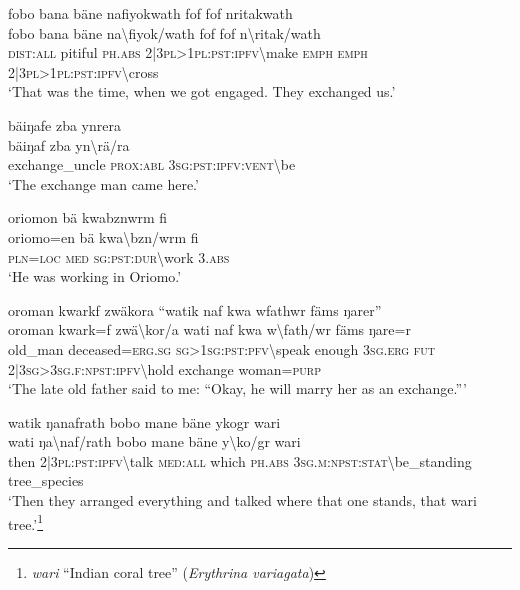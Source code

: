 \ea\label{ex:14:a3165}
fobo bana bäne nafiyokwath fof fof nritakwath\\
\gll fobo	bana	bäne	na{\textbackslash}fiyok/wath	fof	fof	n{\textbackslash}ritak/wath\\
     \textsc{dist}:\textsc{all}	pitiful	\textsc{ph}.\textsc{abs}	2|3\textsc{pl}>1\textsc{pl}:\textsc{pst}:\textsc{ipfv}{\textbackslash}make	\textsc{emph}	\textsc{emph}	2|3\textsc{pl}>1\textsc{pl}:\textsc{pst}:\textsc{ipfv}{\textbackslash}cross\\
\glt `That was the time, when we got engaged. They exchanged us.'
\z

\ea\label{ex:14:a3168}
bäiŋafe zba ynrera\\
\gll bäiŋaf	zba	yn{\textbackslash}rä/ra\\
     exchange\_uncle	\textsc{prox}:\textsc{abl}	3\textsc{sg}:\textsc{pst}:\textsc{ipfv}:\textsc{vent}{\textbackslash}be\\
\glt `The exchange man came here.'
\z

\ea\label{ex:14:a3169}
oriomon bä kwabznwrm fi\\
\gll oriomo=en	bä	kwa{\textbackslash}bzn/wrm	fi\\
     \textsc{pln}=\textsc{loc}	\textsc{med}	\textsc{sg}:\textsc{pst}:\textsc{dur}{\textbackslash}work	3.\textsc{abs}\\
\glt `He was working in Oriomo.'
\z

\ea\label{ex:14:a3170}
oroman kwarkf zwäkora ``watik naf kwa wfathwr fäms ŋarer''\\
\gll oroman	kwark=f	zwä{\textbackslash}kor/a	wati	naf	kwa	w{\textbackslash}fath/wr	fäms	ŋare=r\\
     old\_man	deceased=\textsc{erg}.\textsc{sg}	\textsc{sg}>1\textsc{sg}:\textsc{pst}:\textsc{pfv}{\textbackslash}speak	enough	3\textsc{sg}.\textsc{erg}	\textsc{fut}	2|3\textsc{sg}>3\textsc{sg}.\textsc{f}:\textsc{npst}:\textsc{ipfv}{\textbackslash}hold	exchange	woman=\textsc{purp}\\
\glt `The late old father said to me: ``Okay, he will marry her as an exchange.'''
\z

\ea\label{ex:14:a3171}
watik ŋanafrath bobo mane bäne ykogr wari\\
\gll wati	ŋa{\textbackslash}naf/rath	bobo	mane	bäne	y{\textbackslash}ko/gr	wari\\
     then	2|3\textsc{pl}:\textsc{pst}:\textsc{ipfv}{\textbackslash}talk	\textsc{med}:\textsc{all}	which	\textsc{ph}.\textsc{abs}	3\textsc{sg}.\textsc{m}:\textsc{npst}:\textsc{stat}{\textbackslash}be\_standing	tree\_species\\
\glt `Then they arranged everything and talked where that one stands, that wari tree.'\footnote{\textit{wari} ``Indian coral tree'' (\textit{Erythrina variagata})}
\z

